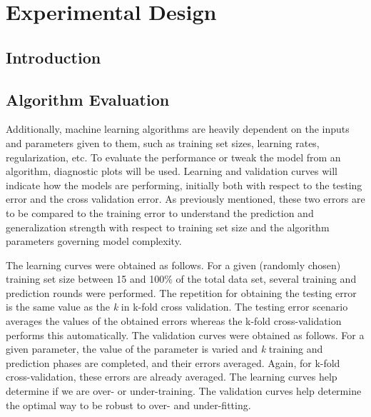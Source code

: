 \section{Experimental Design}
\label{sec:expdesign}

\subsection{Introduction}


\subsection{Algorithm Evaluation}

Additionally, machine learning algorithms are heavily dependent on the inputs
and parameters given to them, such as training set sizes, learning rates,
regularization, etc. To evaluate the performance or tweak the model from an
algorithm, diagnostic plots will be used. Learning and validation curves will
indicate how the models are performing, initially both with respect to the
testing error and the cross validation error. As previously mentioned, these
two errors are to be compared to the training error to understand the
prediction and generalization strength with respect to training set size and
the algorithm parameters governing model complexity. 

The learning curves were obtained as follows. For a given (randomly chosen)
training set size between 15 and 100\% of the total data set, several training
and prediction rounds were performed. The repetition for obtaining the testing
error is the same value as the \textit{k} in k-fold cross validation. The
testing error scenario averages the values of the obtained errors whereas the
k-fold cross-validation performs this automatically.  The validation curves
were obtained as follows. For a given parameter, the value of the parameter is
varied and \textit{k} training and prediction phases are completed, and their
errors averaged. Again, for k-fold cross-validation, these errors are already
averaged. The learning curves help determine if we are over- or under-training.
The validation curves help determine the optimal way to be robust to over- and
under-fitting. 




